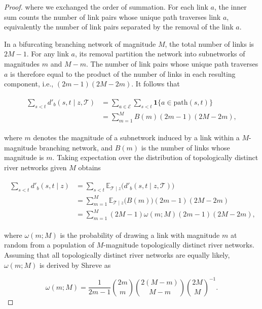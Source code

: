 \documentclass[11pt, class=article, crop=false]{standalone}
\theoremstyle{definition}
\begin{document}
\begin{proof}
where we exchanged the order of summation.
For each link $a$, the inner sum counts the number of link pairs whose unique path traverses link $a$, equivalently the number of link pairs separated by the removal of the link $a$.

In a bifurcating branching network of magnitude $M$, the total number of links is $2M - 1$.
For any link $a$, its removal partition the network into subnetworks of magnitudes $m$ and $M - m$.
The number of link pairs whose unique path traverses $a$ is therefore equal to the product of the number of links in each resulting component, i.e., $(2m - 1)(2M - 2m)$.
It follows that

\begin{align}
    \begin{split}
    \sum_{s < t} d'_b(s, t \mid z, \mathcal{T})
    &= \sum_{a \in \mathcal{E}} \sum_{s < t} \mathbf{1}\{a \in \mathrm{path}(s,t)\}\\
    &= \sum_{m = 1}^M B(m) (2m - 1) (2M - 2m),
    \end{split}
\end{align}

where $m$ denotes the magnitude of a subnetwork induced by a link within a $M$-magnitude branching network, and $B(m)$ is the number of links whose magnitude is $m$.
Taking expectation over the distribution of topologically distinct river networks given $M$ obtains

\begin{align}
    \begin{split}
    \sum_{s < t} d'_b(s, t \mid z)
    &=
    \sum_{s < t} 
    \mathbb{E}_{\mathcal{T} \mid z} \bigl( d'_b(s, t \mid z, \mathcal{T}) \bigr)\\
    &= \sum_{m=1}^M \mathbb{E}_{\mathcal{T} \mid z} \bigl(B(m) \bigr) (2m - 1) (2M - 2m)\\
    &= \sum_{m=1}^M (2M-1)\omega(m; M)(2m - 1) (2M - 2m),
    \end{split}
\end{align}

where $\omega(m; M)$ is the probability of drawing a link with magnitude $m$ at random from a population of $M$-magnitude topologically distinct river networks.
Assuming that all topologically distinct river networks are equally likely, $\omega(m; M)$ is derived by Shreve \citep{shreve_infinite_1967} as

\begin{equation}
    \omega(m; M) = \frac{1}{2m - 1} \binom{2m}{m} \binom{2(M - m)}{M - m} \binom{2M}{M}^{-1}.
    \label{eq:m-pmf}
\end{equation}


\end{proof}
\end{document}

